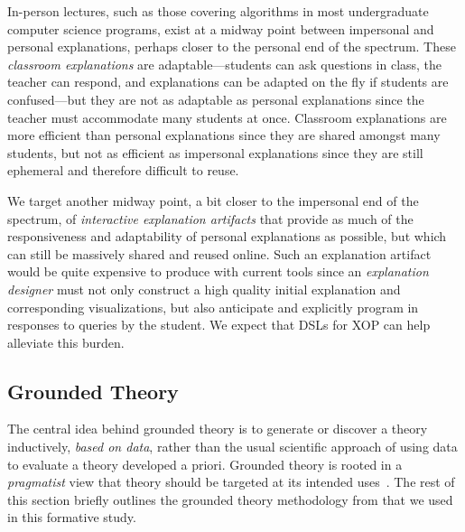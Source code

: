 \documentclass[sigconf]{acmart}
\begin{document}
In-person lectures, such as those covering algorithms in most undergraduate
computer science programs, exist at a midway point between impersonal and
personal explanations, perhaps closer to the personal end of the spectrum.
These \emph{classroom explanations} are adaptable---students can ask questions
in class, the teacher can respond, and explanations can be adapted on the fly
if students are confused---but they are not as adaptable as personal
explanations since the teacher must accommodate many students at once.
Classroom explanations are more efficient than personal explanations since they
are shared amongst many students, but not as efficient as impersonal
explanations since they are still ephemeral and therefore difficult to reuse.


We target another midway point, a bit closer to the impersonal end of the
spectrum, of \emph{interactive explanation artifacts} that provide as much of
the responsiveness and adaptability of personal explanations as possible, but
which can still be massively shared and reused online. Such an explanation
artifact would be quite expensive to produce with current tools since an
\emph{explanation designer} must not only construct a high quality initial
explanation and corresponding visualizations, but also anticipate and
explicitly program in responses to queries by the student.
%
We expect that DSLs for XOP can help alleviate this burden.


\subsection{Grounded Theory}
\label{sec:back:gt}

The central idea behind grounded theory is to generate or discover a theory
inductively, \emph{based on data}, rather than the usual scientific approach of
using data to evaluate a theory developed a priori. 
%
Grounded theory is rooted in a \emph{pragmatist} view that theory should be
targeted at its intended uses~\cite{Strauss67discoveryof}.
%
%
%
%
The rest of this section briefly outlines the grounded theory methodology from
\citet{corbin2014basics} that we used in this formative study.
\end{document}
